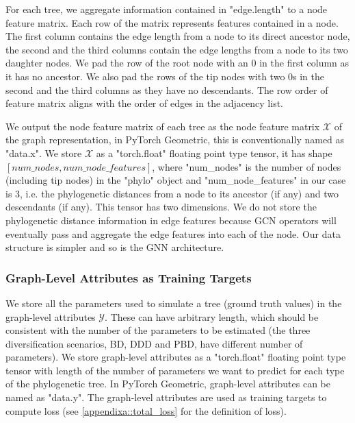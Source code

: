 {For each tree, we aggregate information contained in "edge.length" to a node feature matrix. Each row of the matrix represents features contained in a node. The first column contains the edge length from a node to its direct ancestor node, the second and the third columns contain the edge lengths from a node to its two daughter nodes. We pad the row of the root node with an 0 in the first column as it has no ancestor. We also pad the rows of the tip nodes with two 0s in the second and the third columns as they have no descendants. The row order of feature matrix aligns with the order of edges in the adjacency list. 

We output the node feature matrix of each tree as the node feature matrix $\mathcal{X}$ of the graph representation, in PyTorch Geometric, this is conventionally named as "data.x". We store $\mathcal{X}$ as a "torch.float" floating point type tensor, it has shape $[num\_nodes, num\_node\_features]$, where "num\_nodes" is the number of nodes (including tip nodes) in the "phylo" object and "num\_node\_features" in our case is 3, i.e. the phylogenetic distances from a node to its ancestor (if any) and two descendants (if any). This tensor has two dimensions. We do not store the phylogenetic distance information in edge features because GCN operators will eventually pass and aggregate the edge features into each of the node. Our data structure is simpler and so is the GNN architecture.

\subsubsection{Graph-Level Attributes as Training Targets}
\label{appendix::data_transform::phylo_gnn::graph_attr}
We store all the parameters used to simulate a tree (ground truth values) in the graph-level attributes $\mathcal{Y}$. These can have arbitrary length, which should be consistent with the number of the parameters to be estimated (the three diversification scenarios, BD, DDD and PBD, have different number of parameters). We store graph-level attributes as a "torch.float" floating point type tensor with length of the number of parameters we want to predict for each type of the phylogenetic tree. In PyTorch Geometric, graph-level attributes can be named as "data.y". The graph-level attributes are used as training targets to compute loss (see \autoref{appendixa::total_loss} for the definition of loss).

\clearpage
}

